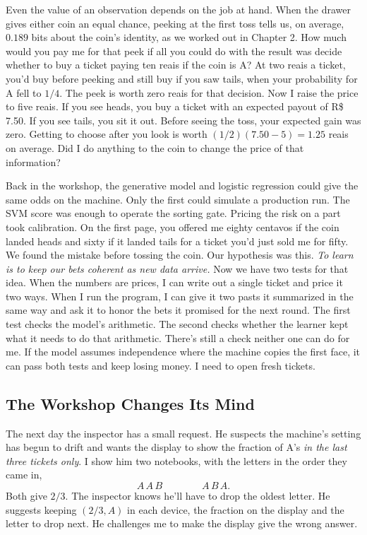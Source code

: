 \documentclass[12pt,oneside]{article}
\newcommand{\secao}[1]{\Needspace{5.2\baselineskip}\subsection*{#1}}
\newcommand{\bookanchor}[1]{\phantomsection\label{#1}}
\begin{document}
Even\bookanchor{topic-07-3} the value of an observation depends on the job at hand. When the drawer gives either coin an equal chance, peeking at the first toss tells us, on average, $0.189$ bits about the coin's identity, as we worked out in Chapter 2. How much would you pay me for that peek if all you could do with the result was decide whether to buy a ticket paying ten reais if the coin is A? At two reais a ticket, you'd buy before peeking and still buy if you saw tails, when your probability for A fell to $1/4$. The peek is worth zero reais for that decision. Now I raise the price to five reais. If you see heads, you buy a ticket with an expected payout of R\$\,7.50. If you see tails, you sit it out. Before seeing the toss, your expected gain was zero. Getting to choose after you look is worth $(1/2)(7.50-5)=1.25$ reais on average. Did I do anything to the coin to change the price of that information?

Back in the workshop, the generative model and logistic regression could give the same odds on the machine. Only the first could simulate a production run. The SVM score was enough to operate the sorting gate. Pricing the risk on a part took calibration. On the first page, you offered me eighty centavos if the coin landed heads and sixty if it landed tails for a ticket you'd just sold me for fifty. We found the mistake before tossing the coin. Our hypothesis was this. \emph{To learn is to keep our bets coherent as new data arrive.} Now we have two tests for that idea. When the numbers are prices, I can write out a single ticket and price it two ways. When I run the program, I can give it two pasts it summarized in the same way and ask it to honor the bets it promised for the next round. The first test checks the model's arithmetic. The second checks whether the learner kept what it needs to do that arithmetic. There's still a check neither one can do for me. If the model assumes independence where the machine copies the first face, it can pass both tests and keep losing money. I need to open fresh tickets.

\secao{The Workshop Changes Its Mind}
The\bookanchor{topic-07-4} next day the inspector has a small request. He suspects the machine's setting has begun to drift and wants the display to show the fraction of A's \emph{in the last three tickets only}. I show him two notebooks, with the letters in the order they came in,
\[
                           A\,A\,B \qquad\qquad A\,B\,A .
\]
Both give $2/3$. The inspector knows he'll have to drop the oldest letter. He suggests keeping $(2/3,A)$ in each device, the fraction on the display and the letter to drop next. He challenges me to make the display give the wrong answer.
\end{document}
